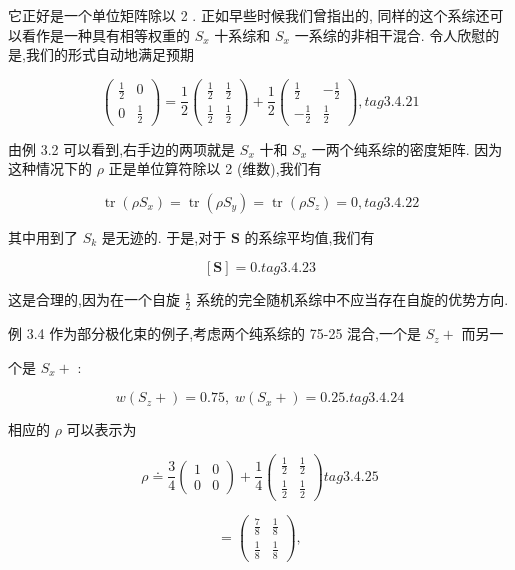 它正好是一个单位矩阵除以 2 . 正如早些时候我们曾指出的, 同样的这个系综还可以看作是一种具有相等权重的 ${S}_{x}$ 十系综和 ${S}_{x}$ 一系综的非相干混合. 令人欣慰的是,我们的形式自动地满足预期

$$
\left( \begin{matrix} \frac{1}{2} & 0 \\ 0 & \frac{1}{2} \end{matrix}\right) = \frac{1}{2}\left( \begin{matrix} \frac{1}{2} & \frac{1}{2} \\ \frac{1}{2} & \frac{1}{2} \end{matrix}\right) + \frac{1}{2}\left( \begin{matrix} \frac{1}{2} & - \frac{1}{2} \\ - \frac{1}{2} & \frac{1}{2} \end{matrix}\right) , tag{3. 4.21}
$$

由例 3.2 可以看到,右手边的两项就是 ${S}_{x}$ 十和 ${S}_{x}$ 一两个纯系综的密度矩阵. 因为这种情况下的 $\rho$ 正是单位算符除以 2 (维数),我们有

$$
\operatorname{tr}\left( {\rho {S}_{x}}\right) = \operatorname{tr}\left( {\rho {S}_{y}}\right) = \operatorname{tr}\left( {\rho {S}_{z}}\right) = 0, tag{3. 4.22}
$$

其中用到了 ${S}_{k}$ 是无迹的. 于是,对于 $\mathbf{S}$ 的系综平均值,我们有

$$
\left\lbrack \mathbf{S}\right\rbrack = 0. tag{3. 4.23}
$$

这是合理的,因为在一个自旋 $\frac{1}{2}$ 系统的完全随机系综中不应当存在自旋的优势方向.

例 3.4 作为部分极化束的例子,考虑两个纯系综的 75-25 混合,一个是 ${S}_{z} +$ 而另一

个是 ${S}_{x} +$ :

$$
w\left( {{S}_{z} + }\right) = {0.75},\;w\left( {{S}_{x} + }\right) = {0.25}. tag{3. 4.24}
$$

相应的 $\rho$ 可以表示为

$$
\rho \doteq \frac{3}{4}\left( \begin{array}{ll} 1 & 0 \\ 0 & 0 \end{array}\right) + \frac{1}{4}\left( \begin{array}{ll} \frac{1}{2} & \frac{1}{2} \\ \frac{1}{2} & \frac{1}{2} \end{array}\right) tag{3. 4.25}
$$

$$
= \left( \begin{array}{ll} \frac{7}{8} & \frac{1}{8} \\ \frac{1}{8} & \frac{1}{8} \end{array}\right) ,
$$


